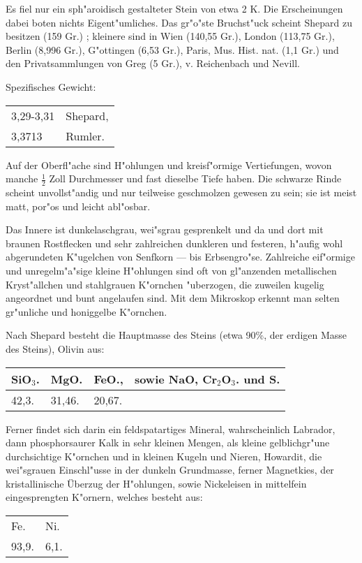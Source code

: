 \documentclass[a4paper, 11pt, oneside]{article}
\begin{document}
Es fiel nur ein sph"aroidisch gestalteter Stein von etwa 2 K. Die Erscheinungen dabei boten nichts Eigent"umliches. Das gr"o"ste Bruchst"uck scheint Shepard zu besitzen (159 Gr.) ; kleinere sind in Wien (140,55 Gr.), London (113,75 Gr.), Berlin (8,996 Gr.), G"ottingen (6,53 Gr.), Paris, Mus. Hist. nat. (1,1 Gr.) und den Privatsammlungen von Greg (5 Gr.), v. Reichenbach und Nevill.

Spezifisches Gewicht: 
\begin{table}[!ht]
    \centering\swabfamily\Large
    \begin{tabular}{l l}
        3,29-3,31 & Shepard,\\
        3,3713 & Rumler.
    \end{tabular}
\end{table}

Auf der Oberfl"ache sind H"ohlungen und kreisf"ormige Vertiefungen, wovon manche $\mathfrak{\frac{1}{2}}$ Zoll Durchmesser und fast dieselbe Tiefe haben. Die schwarze Rinde scheint unvollst"andig und nur teilweise geschmolzen gewesen zu sein; sie ist meist matt, por"os und leicht abl"osbar.

Das Innere ist dunkelaschgrau, wei"sgrau gesprenkelt und da und dort mit braunen Rostflecken und sehr zahlreichen dunkleren und festeren, h"aufig wohl abgerundeten K"ugelchen von Senfkorn --- bis Erbsengro"se. Zahlreiche eif"ormige und unregelm"a"sige kleine H"ohlungen sind oft von gl"anzenden metallischen Kryst"allchen und stahlgrauen K"ornchen "uberzogen, die zuweilen kugelig angeordnet und bunt angelaufen sind. Mit dem Mikroskop erkennt man selten gr"unliche und honiggelbe K"ornchen.

Nach Shepard besteht die Hauptmasse des Steins (etwa 90\%, der erdigen Masse des Steins), Olivin aus:
\begin{table}[!ht]
    \centering\swabfamily\Large
    \begin{tabular}{l l l l}
        SiO$_{3}$. & MgO. & FeO., & sowie NaO, Cr$_{2}$O$_{3}$. und S. \\ \hline
        42,3. & 31,46. & 20,67. &  \\
    \end{tabular}
\end{table}

Ferner findet sich darin ein feldspatartiges Mineral, wahrscheinlich Labrador, dann phosphorsaurer Kalk in sehr kleinen Mengen, als kleine gelblichgr"une durchsichtige K"ornchen und in kleinen Kugeln und Nieren, Howardit, die wei"sgrauen Einschl"usse in der dunkeln Grundmasse, ferner Magnetkies, der kristallinische Überzug der H"ohlungen, sowie Nickeleisen in mittelfein eingesprengten K"ornern, welches besteht aus:
\begin{table}[!ht]
    \centering\swabfamily\Large
    \begin{tabular}{l l}
        Fe. & Ni. \\
        93,9. & 6,1. \\
    \end{tabular}
\end{table}
\end{document}
